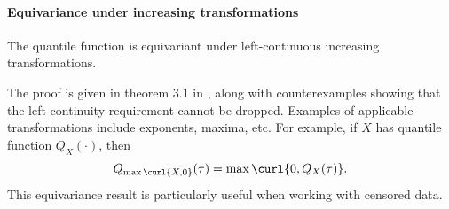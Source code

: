  
 
\paragraph{Equivariance under increasing transformations}


\begin{cl}
	 The quantile function is equivariant under left-continuous increasing transformations.
\end{cl}
The proof is given in  theorem 3.1 in \cite{Hosseini2010QuantilesEquivariance}, along with counterexamples showing that the left continuity requirement cannot be dropped. 
%
Examples of applicable transformations include exponents, maxima, etc.
%
For example, if $X$ has quantile function $Q_X(\cdot)$, then 
\begin{equation}
Q_{\max\curl{X, 0}}(\tau) = \max\curl{0, Q_X(\tau) }.
\end{equation}
This equivariance result is particularly useful  when working with censored data.
%



